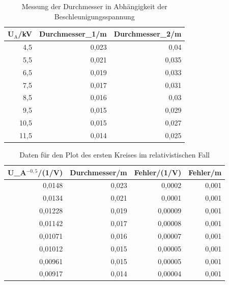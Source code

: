 \documentclass[12pt,a4paper]{article}
\begin{document}
\begin{table}[htbp]
\caption{Messung der Durchmesser in Abhängigkeit der Beschleunigungsspannung}
\begin{center}
\begin{tabular}{|r|r|r|}
\hline
U$_\text{A}$/kV & Durchmesser\_1/m & Durchmesser\_2/m \\ \hline
4,5 & 0,023 & 0,04 \\ \hline
5,5 & 0,021 & 0,035 \\ \hline
6,5 & 0,019 & 0,033 \\ \hline
7,5 & 0,017 & 0,031 \\ \hline
8,5 & 0,016 & 0,03 \\ \hline
9,5 & 0,015 & 0,029 \\ \hline
10,5 & 0,015 & 0,027 \\ \hline
11,5 & 0,014 & 0,025 \\ \hline
\end{tabular}
\end{center}
\label{tab:a_2}
\end{table}

\begin{table}[htbp]
\caption{Daten für den Plot des ersten Kreises im relativistischen Fall}
\begin{center}
\begin{tabular}{|r|r|r|r|}
\hline
\multicolumn{1}{|l|}{U\_A$^{-0,5}$/(1/V)} & \multicolumn{1}{l|}{Durchmesser/m} & \multicolumn{1}{l|}{Fehler/(1/V)} & \multicolumn{1}{l|}{Fehler/m} \\ \hline
0,0148 & 0,023 & 0,0002 & 0,001 \\ \hline
0,0134 & 0,021 & 0,0001 & 0,001 \\ \hline
0,01228 & 0,019 & 0,00009 & 0,001 \\ \hline
0,01142 & 0,017 & 0,00008 & 0,001 \\ \hline
0,01071 & 0,016 & 0,00007 & 0,001 \\ \hline
0,01012 & 0,015 & 0,00005 & 0,001 \\ \hline
0,00961 & 0,015 & 0,00005 & 0,001 \\ \hline
0,00917 & 0,014 & 0,00004 & 0,001 \\ \hline
\end{tabular}
\end{center}
\label{tab:p_1_r}
\end{table}
\end{document}
